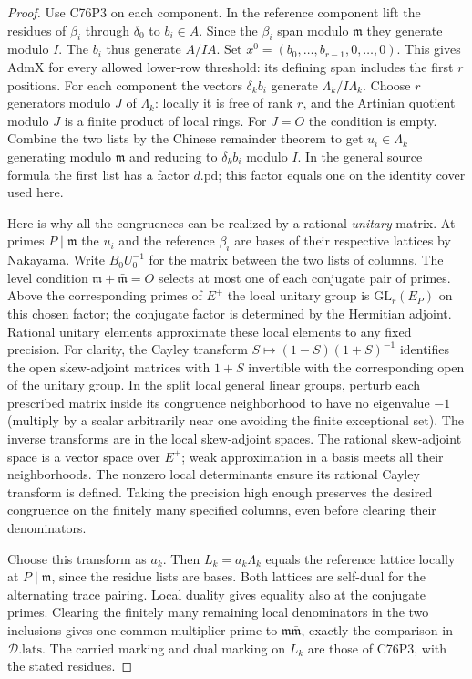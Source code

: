 \begin{proof}
Use C76P3 on each component. In the reference component lift
the residues of $\beta_i$ through $\delta_0$ to $b_i\in A$.
Since the $\beta_i$ span modulo $\mathfrak m$ they generate
modulo $I$. The $b_i$ thus generate $A/IA$. Set
$x^0=(b_0,\ldots,b_{r-1},0,\ldots,0)$. This gives
$\mathrm{AdmX}$ for every allowed lower-row threshold: its defining
span includes the first $r$ positions. For each component the
vectors $\delta_k b_i$ generate $\Lambda_k/I\Lambda_k$.
Choose $r$ generators modulo $J$ of $\Lambda_k$: locally it is
free of rank $r$, and the Artinian quotient modulo $J$ is a
finite product of local rings. For $J=O$ the condition is empty.
Combine the two lists by the Chinese remainder theorem to get
$u_i\in\Lambda_k$ generating modulo $\mathfrak m$ and reducing
to $\delta_k b_i$ modulo $I$. In the general source formula the
first list has a factor $d.\mathrm{pd}$; this factor equals one
on the identity cover used here.

Here is why all the congruences can be realized by a rational
\emph{unitary} matrix. At primes $P\mid\mathfrak m$ the $u_i$ and
the reference $\beta_i$ are bases of their respective lattices by
Nakayama. Write $B_0 U_0^{-1}$ for the matrix between the two lists
of columns. The level condition
$\mathfrak m+\bar{\mathfrak m}=O$ selects at most one of each
conjugate pair of primes. Above the corresponding primes of
$E^+$ the local unitary group is $\mathrm{GL}_r(E_P)$ on this
chosen factor; the conjugate factor is determined by the Hermitian
adjoint. Rational unitary elements approximate these local elements
to any fixed precision. For clarity, the Cayley transform
$S\mapsto (1-S)(1+S)^{-1}$ identifies the open skew-adjoint
matrices with $1+S$ invertible with the corresponding open of
the unitary group. In the split local general linear groups,
perturb each prescribed matrix inside its congruence neighborhood
to have no eigenvalue $-1$ (multiply by a scalar arbitrarily near
one avoiding the finite exceptional set). The inverse transforms
are in the local skew-adjoint spaces. The rational skew-adjoint
space is a vector space over $E^+$; weak approximation in a basis
meets all their neighborhoods. The nonzero local determinants
ensure its rational Cayley transform is defined. Taking the
precision high enough preserves the desired congruence on the
finitely many specified columns, even before clearing their
denominators.

Choose this transform as $a_k$. Then $L_k=a_k\Lambda_k$ equals
the reference lattice locally at $P\mid\mathfrak m$, since the
residue lists are bases. Both lattices are self-dual for the
alternating trace pairing. Local duality gives equality also
at the conjugate primes. Clearing the finitely many remaining
local denominators in the two inclusions gives one common multiplier
prime to $\mathfrak m\bar{\mathfrak m}$, exactly the comparison
in $\mathcal D.\mathrm{lats}$. The carried marking and dual
marking on $L_k$ are those of C76P3, with the stated residues.


\end{proof}

